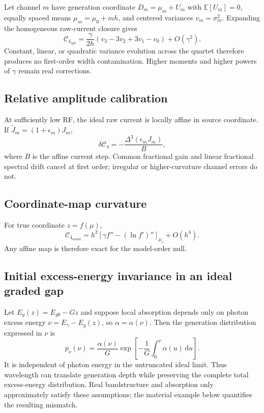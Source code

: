 \documentclass[11pt]{article}
\newcommand{\Cfour}{\mathcal{C}_4}
\newcommand{\E}{\mathbb{E}}
\newcommand{\dd}{\mathrm{d}}
\begin{document}
Let channel $m$ have generation coordinate $D_m=\mu_m+U_m$ with $\E[U_m]=0$, equally spaced means $\mu_m=\mu_0+mh$, and centered variances $v_m=\sigma_m^2$. Expanding the homogeneous raw-current closure gives
\begin{equation}
\boxed{
\Cfour_{\mathrm{opt}}
=\frac{\gamma}{2h}(v_3-3v_2+3v_1-v_0)+O(\gamma^2).}
\label{eq:opticalerror}
\end{equation}
Constant, linear, or quadratic variance evolution across the quartet therefore produces no first-order width contamination. Higher moments and higher powers of $\gamma$ remain real corrections.

\subsection{Relative amplitude calibration}

At sufficiently low RF, the ideal raw current is locally affine in source coordinate. If $\widetilde J_m=(1+\epsilon_m)J_m$,
\begin{equation}
\boxed{
\delta\Cfour=-\frac{\Delta^3(\epsilon_mJ_m)}{B},}
\label{eq:ampcal}
\end{equation}
where $B$ is the affine current step. Common fractional gain and linear fractional spectral drift cancel at first order; irregular or higher-curvature channel errors do not.

\subsection{Coordinate-map curvature}

For true coordinate $z=f(\mu)$,
\begin{equation}
\boxed{
\Cfour_{\mathrm{coord}}
=h^2\left[\gamma f''-(\ln f')''\right]_{\mu_c}+O(h^4).}
\label{eq:coorderror}
\end{equation}
Any affine map is therefore exact for the model-order null.

\subsection{Initial excess-energy invariance in an ideal graded gap}

Let $E_g(z)=E_{g0}-Gz$ and suppose local absorption depends only on photon excess energy $\nu=E_\gamma-E_g(z)$, so $\alpha=\alpha(\nu)$. Then the generation distribution expressed in $\nu$ is
\begin{equation}
\boxed{
p_\nu(\nu)
=\frac{\alpha(\nu)}{G}
\exp\left[-\frac{1}{G}\int_0^\nu\alpha(u)\,\dd u\right].}
\label{eq:energyinvariance}
\end{equation}
It is independent of photon energy in the untruncated ideal limit. Thus wavelength can translate generation depth while preserving the complete total excess-energy distribution. Real bandstructure and absorption only approximately satisfy these assumptions; the material example below quantifies the resulting mismatch.
\end{document}
